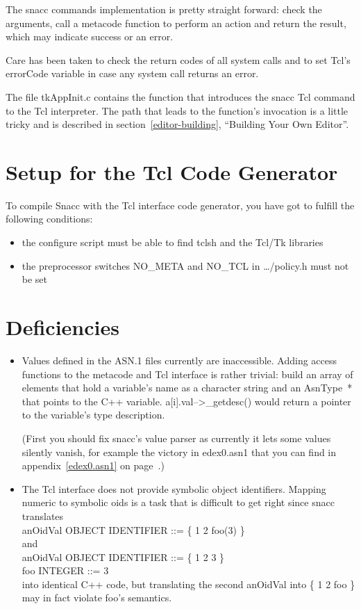 The {\Tcl snacc} commands implementation is pretty straight forward: check the arguments, call a metacode function to perform an action and return the result, which may indicate success or an error.

Care has been taken to check the return codes of all system calls and to set Tcl's {\Tcl errorCode} variable in case any system call returns an error.

The file {\ufn tkAppInit.c} contains the function that introduces the {\Tcl snacc} Tcl command to the Tcl interpreter.
The path that leads to the function's invocation is a little tricky and is described in section~\ref{editor-building}, ``Building Your Own Editor''.

\section{Setup for the Tcl Code Generator}

To compile Snacc with the Tcl interface code generator, you have got to fulfill the following conditions:
\begin{itemize}
  \item the configure script must be able to find {\ufn tclsh} and the Tcl/Tk libraries
  \item the preprocessor switches {\C NO\_META} and {\C NO\_TCL} in {\ufn \dots/policy.h} must not be set
\end{itemize}

\section{\label{tcl-if-deficiencies}Deficiencies}

\begin{itemize}
  \item
    Values defined in the ASN.1 files currently are inaccessible.
    Adding access functions to the metacode and Tcl interface is rather trivial: build an array of elements that hold a variable's name as a character string and an {\C AsnType~*} that points to the C++ variable.
    {\C a[i].val-->\_getdesc()} would return a pointer to the variable's type description.

    (First you should fix snacc's value parser as currently it lets some values silently vanish, for example the {\ASN victory} in {\ufn edex0.asn1} that you can find in appendix~\ref{edex0.asn1} on page~\pageref{edex0.asn1}.)
  \item
    The Tcl interface does not provide symbolic object identifiers.
    Mapping numeric to symbolic oids is a task that is difficult to get right since snacc translates\\
    {\ASN anOidVal OBJECT IDENTIFIER ::= \{ 1 2 foo(3) \}}\\
    and\\
    {\ASN anOidVal OBJECT IDENTIFIER ::= \{ 1 2 3 \}\\
    foo INTEGER ::= 3}\\
    into identical C++ code, but translating the second {\ASN anOidVal} into {\ASN \{ 1 2 foo \}} may in fact violate {\ASN foo}'s semantics.
\end{itemize}
